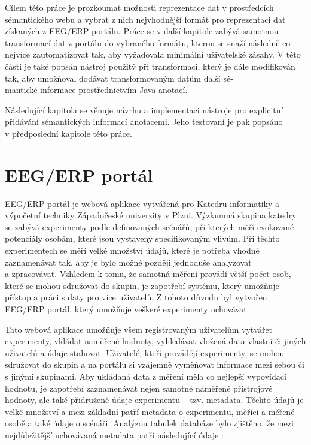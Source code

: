 \documentclass{projekt}
\begin{document}
Cílem této práce je prozkoumat možnosti reprezentace dat v prostředcích sémantického webu a vybrat z nich nejvhodnější formát pro reprezentaci dat získaných z EEG/ERP portálu. Práce se v další kapitole zabývá samotnou transformací dat z portálu do vybraného formátu, kterou se snaží následně co nejvíce zautomatizovat tak, aby vyžadovala minimální uživatelské zásahy. V této části je také popsán nástroj použitý při transformaci, který je dále modifikován tak, aby umožňoval dodávat transformovaným datům další sé-\\mantické informace prostřednictvím Java anotací.


Následující kapitola se věnuje návrhu a implementaci nástroje pro explicitní přidávání sémantických informací anotacemi. Jeho testovaní je pak popsáno \\v předposlední kapitole této práce.


\setcounter{page}{1}
\chapter{EEG/ERP portál}
\hspace{0.65cm}EEG/ERP portál je webová aplikace vytvářená pro Katedru informatiky a výpočetní techniky Západočeské univerzity v Plzni. Výzkumná skupina katedry se zabývá experimenty podle definovaných scénářů, při kterých měří evokované potenciály osobám, které jsou vystaveny specifikovaným vlivům. Při těchto experimentech se měří velké množství údajů, které je potřeba vhodně zaznamenávat tak, aby je bylo možné později jednoduše analyzovat \\a zpracovávat. Vzhledem k tomu, že samotná měření provádí větší počet osob, které se mohou sdružovat do skupin, je zapotřebí systému, který umožňuje přístup a práci s daty pro více uživatelů. Z tohoto důvodu byl vytvořen EEG/ERP portál, který umožňuje veškeré experimenty uchovávat.


Tato webová aplikace umožňuje všem registrovaným uživatelům vytvářet experimenty, vkládat naměřené hodnoty, vyhledávat vložená data vlastní či jiných uživatelů a údaje stahovat. Uživatelé, kteří provádějí experimenty, se mohou sdružovat do skupin a na portálu si vzájemně vyměňovat informace mezi sebou či s jinými skupinami. 
Aby ukládaná data z měření měla co nejlepší vypovídací hodnotu, je zapotřebí zaznamenávat nejen samotné naměřené přístrojové hodnoty, ale také přidružené údaje experimentu – tzv. metadata. Těchto údajů je velké množství a mezi základní patří metadata o experimentu, měřící a měřené osobě a také údaje o scénáři. 
Analýzou tabulek databáze bylo zjištěno, že mezi nejdůležitější uchovávaná metadata patří následující údaje \cite{diplomka}:
\end{document}
